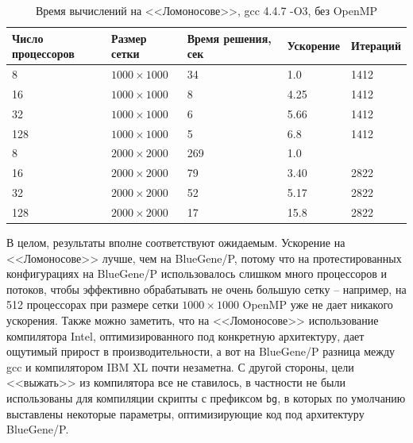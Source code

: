 \documentclass[12pt,notitlepage,oneside]{extarticle}
\begin{document}
\begin{table}[h]
\centering
\caption{Время вычислений на <<Ломоносове>>, gcc 4.4.7 -O3, без OpenMP}
\label{lom_gcc:table}
\begin{tabular}{|l|l|l|l|l|}
\textbf{Число процессоров} & \textbf{Размер сетки} & \textbf{Время решения, сек} & \textbf{Ускорение} & \textbf{Итераций}      \\  \hline
8                          & $1000 \times 1000 $        & 34                            &   1.0                 & 1412                       \\
16                         & $1000 \times 1000 $        & 8                          & 4.25                   & 1412                   \\
32                         & $1000 \times 1000 $        & 6                          & 5.66                   & 1412                   \\
128                        & $1000 \times 1000 $        & 5                         & 6.8                   & 1412                   \\ \hline
8                          & $2000 \times 2000 $        & 269                            & 1.0                   &                        \\
16                         & $2000 \times 2000 $        & 79                         & 3.40                   & 2822                   \\
32                         & $2000 \times 2000 $        & 52                         & 5.17                   & 2822                   \\
128                        & $2000 \times 2000 $        & 17                          & 15.8                   & 2822
\end{tabular}
\end{table}

В целом, результаты вполне соответствуют ожидаемым. Ускорение на <<Ломоносове>>
лучше, чем на BlueGene/P, потому что на протестированных конфигурациях на
BlueGene/P использовалось слишком много процессоров и потоков, чтобы эффективно
обрабатывать не очень большую сетку -- например, на 512 процессорах при размере
сетки $1000 \times 1000$ OpenMP уже не дает никакого ускорения. Также можно
заметить, что на <<Ломоносове>> использование компилятора Intel,
оптимизированного под конкретную архитектуру, дает ощутимый прирост в
производительности, а вот на BlueGene/P разница между gcc и компилятором IBM XL
почти незаметна. С другой стороны, цели <<выжать>> из компилятора все не
ставилось, в частности не были использованы для компиляции скрипты с префиксом
\texttt{bg}, в которых по умолчанию выставлены некоторые параметры, оптимизирующие
код под архитектуру BlueGene/P.
\end{document}
